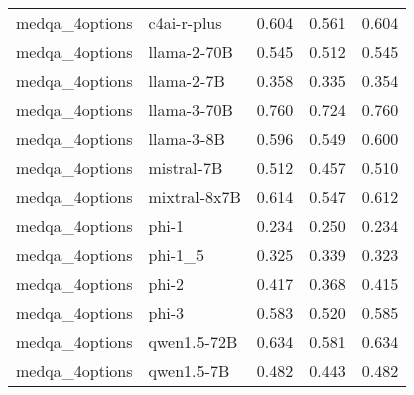 \begin{tabular}{llrrr}
medqa_4options & c4ai-r-plus & 0.604 & 0.561 & 0.604 \\
medqa_4options & llama-2-70B & 0.545 & 0.512 & 0.545 \\
medqa_4options & llama-2-7B & 0.358 & 0.335 & 0.354 \\
medqa_4options & llama-3-70B & 0.760 & 0.724 & 0.760 \\
medqa_4options & llama-3-8B & 0.596 & 0.549 & 0.600 \\
medqa_4options & mistral-7B & 0.512 & 0.457 & 0.510 \\
medqa_4options & mixtral-8x7B & 0.614 & 0.547 & 0.612 \\
medqa_4options & phi-1 & 0.234 & 0.250 & 0.234 \\
medqa_4options & phi-1_5 & 0.325 & 0.339 & 0.323 \\
medqa_4options & phi-2 & 0.417 & 0.368 & 0.415 \\
medqa_4options & phi-3 & 0.583 & 0.520 & 0.585 \\
medqa_4options & qwen1.5-72B & 0.634 & 0.581 & 0.634 \\
medqa_4options & qwen1.5-7B & 0.482 & 0.443 & 0.482 \\
\bottomrule
\end{tabular}

